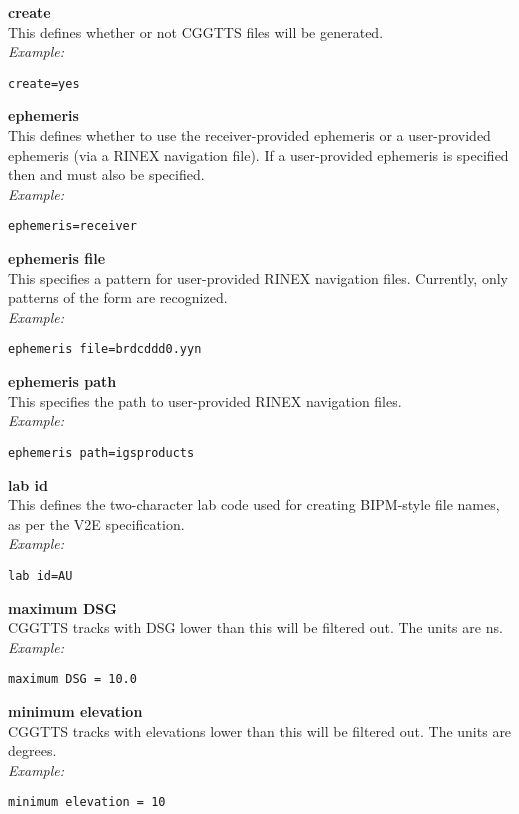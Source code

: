 {\bfseries create}\\
This defines whether or not CGGTTS files will be generated.\\
\textit{Example:}
\begin{lstlisting}
create=yes
\end{lstlisting}

{\bfseries ephemeris}\\
This defines whether to use the receiver-provided ephemeris or a user-provided ephemeris (via a RINEX navigation file).
If a user-provided ephemeris is specified then  and  
must also be specified.\\
\textit{Example:}
\begin{lstlisting}
ephemeris=receiver
\end{lstlisting}

{\bfseries ephemeris file}\\
This specifies a pattern for user-provided RINEX navigation files.
Currently, only patterns of the form  are recognized.\\
\textit{Example:}
\begin{lstlisting}
ephemeris file=brdcddd0.yyn
\end{lstlisting}

{\bfseries ephemeris path}\\
This specifies the path to user-provided RINEX navigation files.\\
\textit{Example:}
\begin{lstlisting}
ephemeris path=igsproducts
\end{lstlisting}

{\bfseries lab id}\\
This defines the two-character lab code used for creating BIPM-style file names, as per the V2E specification.\\
\textit{Example:}
\begin{lstlisting}
lab id=AU
\end{lstlisting}

{\bfseries maximum DSG}\\
CGGTTS tracks with DSG lower than this will be filtered out. 
The units are ns.\\
\textit{Example:}
\begin{lstlisting}
maximum DSG = 10.0
\end{lstlisting}

{\bfseries minimum elevation}\\
CGGTTS tracks with elevations lower than this will be filtered out. 
The units are degrees.\\
\textit{Example:}
\begin{lstlisting}
minimum elevation = 10
\end{lstlisting}

